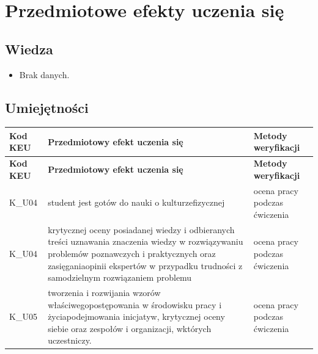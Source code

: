 \documentclass[12pt, a4paper]{article}
\newcommand{\thdrule}{\noalign{\global\setlength{\extrarowheight}{0pt}}}
\newcommand{\thdend}{\noalign{\global\setlength{\extrarowheight}{3pt}}}
\begin{document}
\section{Przedmiotowe efekty uczenia się}

\subsection*{Wiedza}
\begin{itemize}
  \item Brak danych.
\end{itemize}

\subsection*{Umiejętności}
{\scriptsize
\begin{longtable}{m{1.6cm}m{9.0cm}m{4.2cm}}
\thdrule\toprule
\rowcolor{pjatkRed} {\color{white}\footnotesize\textbf{\vphantom{Ag}Kod KEU}} & {\color{white}\footnotesize\textbf{\vphantom{Ag}Przedmiotowy efekt uczenia się}} & {\color{white}\footnotesize\textbf{\vphantom{Ag}Metody weryfikacji}} \\
\midrule\thdend
\endfirsthead
\thdrule\toprule
\rowcolor{pjatkRed} {\color{white}\footnotesize\textbf{\vphantom{Ag}Kod KEU}} & {\color{white}\footnotesize\textbf{\vphantom{Ag}Przedmiotowy efekt uczenia się}} & {\color{white}\footnotesize\textbf{\vphantom{Ag}Metody weryfikacji}} \\
\midrule\thdend
\endhead
  \rowcolor{tableRowLight} K\_U04 & student jest gotów do nauki o kulturzefizycznej & ocena pracy podczas ćwiczenia \\
  \rowcolor{tableRowAlt} K\_U04 & krytycznej oceny posiadanej wiedzy i odbieranych treści uznawania znaczenia wiedzy w rozwiązywaniu problemów poznawczych i praktycznych oraz zasięganiaopinii ekspertów w przypadku trudności z samodzielnym rozwiązaniem problemu & ocena pracy podczas ćwiczenia \\
  \rowcolor{tableRowLight} K\_U05 & tworzenia i rozwijania wzorów właściwegopostępowania w środowisku pracy i życiapodejmowania inicjatyw, krytycznej oceny siebie oraz zespołów i organizacji, wktórych uczestniczy. & ocena pracy podczas ćwiczenia \\
\bottomrule
\end{longtable}}
\end{document}
